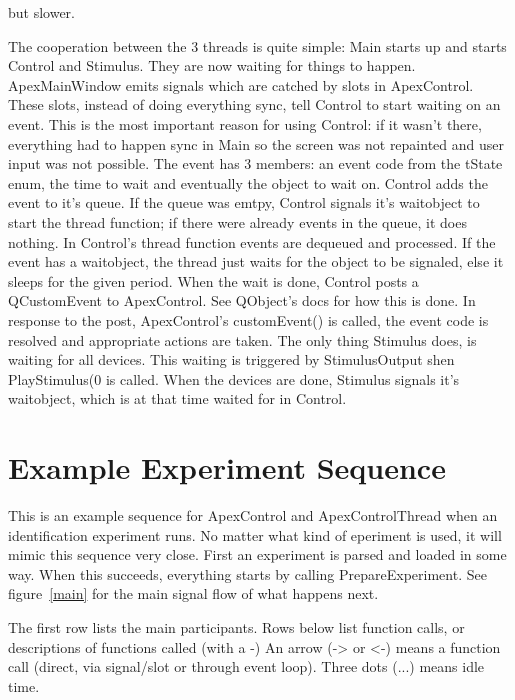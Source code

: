 \documentclass[a4paper,12pt]{article}
\begin{document}
but slower.

The cooperation between the 3 threads is quite simple: 
Main starts up and starts Control and Stimulus. They are now waiting for things 
to happen. 
ApexMainWindow emits signals which are catched by slots in ApexControl.
These slots, instead of doing everything sync, tell Control to start waiting on 
an event.
This is the most important reason for using Control: if it wasn't there, 
everything had to 
happen sync in Main so the screen was not repainted and user input was not 
possible.
The event has 3 members: an event code from the tState enum, the time to wait 
and eventually
the object to wait on. 
Control adds the event to it's queue. If the queue was emtpy, Control signals 
it's waitobject 
to start the thread function; if there were already events in the queue, it does 
nothing.
In Control's thread function events are dequeued and processed. If the event has 
a waitobject,
the thread just waits for the object to be signaled, else it sleeps for the 
given period.
When the wait is done, Control posts a QCustomEvent to ApexControl. See 
QObject's docs for how
this is done. In response to the post, ApexControl's customEvent() is called, 
the event code is resolved and appropriate actions are taken.
The only thing Stimulus does, is waiting for all devices. This waiting is 
triggered by StimulusOutput 
shen PlayStimulus(0 is called. When the devices are done, Stimulus signals it's
waitobject, which is at that time waited for in Control.



\section{Example Experiment Sequence}
This is an example sequence for ApexControl and ApexControlThread when an identification experiment runs.
No matter what kind of eperiment is used, it will mimic this sequence very close.
First an experiment is parsed and loaded in some way. When this succeeds, everything starts by calling
PrepareExperiment.
See figure~\ref{main} for the main signal flow of what happens next.

The first row lists the main participants.
Rows below list function calls, or descriptions of functions called (with a -)
An arrow (-> or <-) means a function call (direct, via signal/slot or through event loop).
Three dots (...) means idle time.
\end{document}
